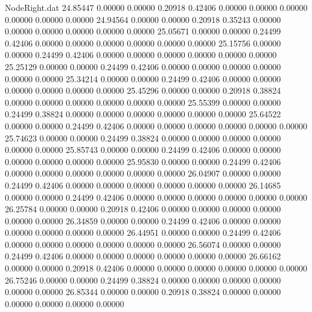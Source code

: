 \begin{filecontents}{NodeRight.dat}
  24.85447    0.00000    0.00000     0.20918    0.42406    0.00000    0.00000    0.00000    0.00000    0.00000    0.00000
  24.94564    0.00000    0.00000     0.20918    0.35243    0.00000    0.00000    0.00000    0.00000    0.00000    0.00000
  25.05671    0.00000    0.00000     0.24499    0.42406    0.00000    0.00000    0.00000    0.00000    0.00000    0.00000
  25.15756    0.00000    0.00000     0.24499    0.42406    0.00000    0.00000    0.00000    0.00000    0.00000    0.00000
  25.25129    0.00000    0.00000     0.24499    0.42406    0.00000    0.00000    0.00000    0.00000    0.00000    0.00000
  25.34214    0.00000    0.00000     0.24499    0.42406    0.00000    0.00000    0.00000    0.00000    0.00000    0.00000
  25.45296    0.00000    0.00000     0.20918    0.38824    0.00000    0.00000    0.00000    0.00000    0.00000    0.00000
  25.55399    0.00000    0.00000     0.24499    0.38824    0.00000    0.00000    0.00000    0.00000    0.00000    0.00000
  25.64522    0.00000    0.00000     0.24499    0.42406    0.00000    0.00000    0.00000    0.00000    0.00000    0.00000
  25.74623    0.00000    0.00000     0.24499    0.38824    0.00000    0.00000    0.00000    0.00000    0.00000    0.00000
  25.85743    0.00000    0.00000     0.24499    0.42406    0.00000    0.00000    0.00000    0.00000    0.00000    0.00000
  25.95830    0.00000    0.00000     0.24499    0.42406    0.00000    0.00000    0.00000    0.00000    0.00000    0.00000
  26.04907    0.00000    0.00000     0.24499    0.42406    0.00000    0.00000    0.00000    0.00000    0.00000    0.00000
  26.14685    0.00000    0.00000     0.24499    0.42406    0.00000    0.00000    0.00000    0.00000    0.00000    0.00000
  26.25784    0.00000    0.00000     0.20918    0.42406    0.00000    0.00000    0.00000    0.00000    0.00000    0.00000
  26.34859    0.00000    0.00000     0.24499    0.42406    0.00000    0.00000    0.00000    0.00000    0.00000    0.00000
  26.44951    0.00000    0.00000     0.24499    0.42406    0.00000    0.00000    0.00000    0.00000    0.00000    0.00000
  26.56074    0.00000    0.00000     0.24499    0.42406    0.00000    0.00000    0.00000    0.00000    0.00000    0.00000
  26.66162    0.00000    0.00000     0.20918    0.42406    0.00000    0.00000    0.00000    0.00000    0.00000    0.00000
  26.75246    0.00000    0.00000     0.24499    0.38824    0.00000    0.00000    0.00000    0.00000    0.00000    0.00000
  26.85344    0.00000    0.00000     0.20918    0.38824    0.00000    0.00000    0.00000    0.00000    0.00000    0.00000
\end{filecontents}
